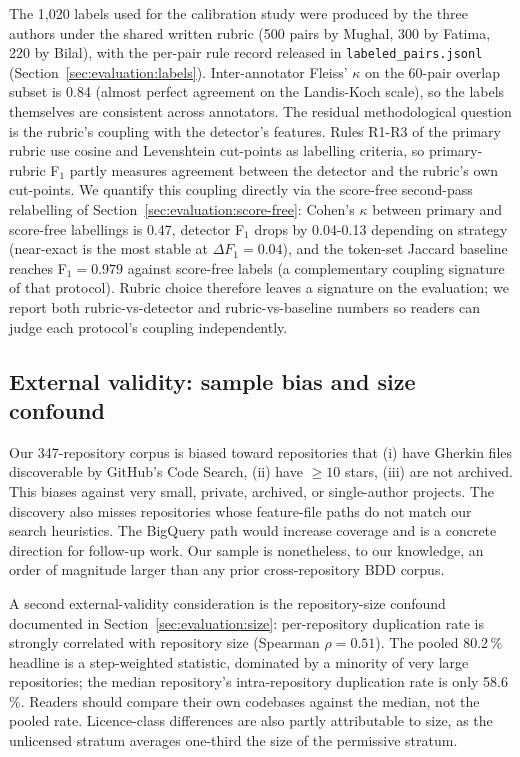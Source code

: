 \documentclass[11pt,a4paper]{article}
\begin{document}
The 1{,}020 labels used for the calibration study were produced by
the three authors under the shared written rubric (500 pairs by
Mughal, 300 by Fatima, 220 by Bilal), with the per-pair rule record
released in \texttt{labeled\_pairs.jsonl}
(Section~\ref{sec:evaluation:labels}). Inter-annotator Fleiss'
$\kappa$ on the 60-pair overlap subset is 0.84 (almost perfect
agreement on the Landis-Koch scale), so the labels themselves are
consistent across annotators. The residual methodological question is the rubric's
coupling with the detector's features. Rules R1-R3 of the primary rubric
use cosine and Levenshtein cut-points as labelling criteria, so
primary-rubric F$_1$ partly measures agreement between the detector
and the rubric's own cut-points. We quantify this coupling directly
via the score-free second-pass relabelling of
Section~\ref{sec:evaluation:score-free}: Cohen's $\kappa$ between
primary and score-free labellings is 0.47, detector F$_1$ drops by
0.04-0.13 depending on strategy (near-exact is the most stable at
$\Delta F_1 = 0.04$), and the token-set Jaccard baseline reaches
F$_1 = 0.979$ against score-free labels (a complementary coupling
signature of that protocol). Rubric choice therefore leaves a
signature on the evaluation; we report both rubric-vs-detector and
rubric-vs-baseline numbers so readers can judge each protocol's
coupling independently.

\subsection{External validity: sample bias and size confound}

Our 347-repository corpus is biased toward repositories that (i) have
Gherkin files discoverable by GitHub's Code Search, (ii) have
$\geq 10$ stars, (iii) are not archived. This biases against very
small, private, archived, or single-author projects. The discovery
also misses repositories whose feature-file paths do not match our
search heuristics. The BigQuery path
\citep{ghtorrent2012,ghtorrent2014} would increase coverage and is a
concrete direction for follow-up work. Our sample is nonetheless,
to our knowledge, an order of magnitude larger than any prior
cross-repository BDD corpus.

A second external-validity consideration is the repository-size
confound documented in Section~\ref{sec:evaluation:size}: per-repository
duplication rate is strongly correlated with repository size
(Spearman $\rho = 0.51$). The pooled 80.2\,\% headline is a step-weighted
statistic, dominated by a minority of very large repositories; the
median repository's intra-repository duplication rate is only
58.6\,\%. Readers should compare their own codebases against the
median, not the pooled rate. Licence-class differences are also
partly attributable to size, as the unlicensed stratum averages
one-third the size of the permissive stratum.
\end{document}
